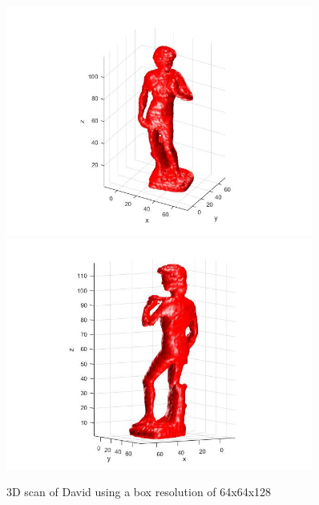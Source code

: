 \documentclass[12pt]{article}
\begin{document}
\vspace{5mm}
\begin{figure}[H]
	\centering
	\includegraphics[width=0.9\textwidth]{david_128_1.jpg}
	\includegraphics[width=0.9\textwidth]{david_128_2.jpg}
	\caption{3D scan of David using a box resolution of 64x64x128}
	\label{fig1}
\end{figure}
\vspace{5mm}
\end{document}
